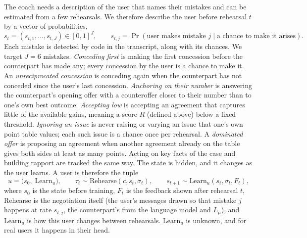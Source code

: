 \documentclass[11pt]{article}
\makeatletter
\renewcommand\paragraph{\@startsection{paragraph}{4}{\z@}{0.7ex \@plus 0.3ex}{-1em}{\normalfont\normalsize\bfseries}}
\makeatother
\begin{document}
\paragraph{4. The user's state $s$.}
The coach needs a description of the user that names their mistakes and can be estimated from a few rehearsals. We therefore describe the user before rehearsal $t$ by a vector of probabilities,
\begin{equation}
s_t = (s_{t,1}, \dots, s_{t,J}) \in [0,1]^J, \qquad s_{t,j} = \Pr(\text{user makes mistake } j \mid \text{a chance to make it arises}).
\end{equation}
Each mistake is detected by code in the transcript, along with its chances. We target $J = 6$ mistakes. \emph{Conceding first} is making the first concession before the counterpart has made any; every concession by the user is a chance to make it. An \emph{unreciprocated concession} is conceding again when the counterpart has not conceded since the user's last concession. \emph{Anchoring on their number} is answering the counterpart's opening offer with a counteroffer closer to their number than to one's own best outcome. \emph{Accepting low} is accepting an agreement that captures little of the available gains, meaning a score $R$ (defined above) below a fixed threshold. \emph{Ignoring an issue} is never raising or varying an issue that one's own point table values; each such issue is a chance once per rehearsal. A \emph{dominated offer} is proposing an agreement when another agreement already on the table gives both sides at least as many points. Acting on key facts of the case and building rapport are tracked the same way. The state is hidden, and it changes as the user learns. A user is therefore the tuple
\begin{equation}
u = \big( s_0,\; \mathrm{Learn}_u \big), \qquad \tau_t \sim \mathrm{Rehearse}(c, s_t, \sigma_t), \qquad s_{t+1} \sim \mathrm{Learn}_u(s_t, \sigma_t, F_t),
\end{equation}
where $s_0$ is the state before training, $F_t$ is the feedback shown after rehearsal $t$, Rehearse is the negotiation itself (the user's messages drawn so that mistake $j$ happens at rate $s_{t,j}$, the counterpart's from the language model and $L_\mu$), and $\mathrm{Learn}_u$ is how this user changes between rehearsals. $\mathrm{Learn}_u$ is unknown, and for real users it happens in their head.
\end{document}
